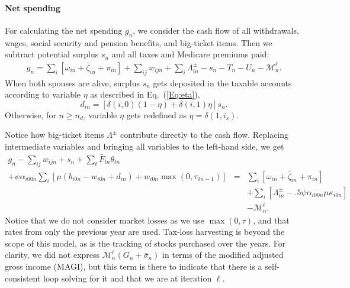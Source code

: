 \documentclass{report}[fleqn,12pt]
\begin{document}
\paragraph*{Net spending}
	For calculating the net spending $g_n$, we consider the cash flow of all withdrawals,
	wages, social security and pension benefits, and big-ticket items. 
	Then we subtract potential surplus $s_{n}$ and all taxes and Medicare premiums paid:
	\begin{eqnarray}
		g_n = \sum_i [\omega_{in} + \bar{\zeta}_{in} + \pi_{in} ] 
		+ \sum_{ij} w_{ijn} + \sum_i \Lambda^\pm_{in} - s_{n}
		- T_n - U_n - \mathcal{M}^\ell_n.
	\end{eqnarray}
	When both spouses are alive, surplus $s_n$ gets deposited in the taxable accounts
	according to variable $\eta$ as described in Eq.~(\ref{Eq:eta}),
	\begin{equation}
		\label{Eq:eta2}
		d_{in} = [\delta(i, 0)(1 - \eta) + \delta(i, 1)\eta] s_n .
	\end{equation}
	Otherwise, for $n \ge n_d$, variable $\eta$ gets redefined as $\eta = \delta(1, i_s)$.

	Notice how big-ticket items $\Lambda^\pm$ contribute directly to the cash flow.
	Replacing intermediate variables and bringing all variables to the left-hand side, we get
	\begin{eqnarray}
		\label{Eq:C4}
		g_n - \sum_{ij} w_{ijn} + s_{n}
		+ \sum_t \bar{F}_{tn} \theta_{t n} &&\nonumber \\
		+ \psi\alpha_{i00n} \sum_{i} \left[\mu(b_{i0n} - w_{i0n} + d_{in})
		+ w_{i0n}\max(0, \tau_{0n-1})\right] 
		&=& \sum_i [\omega_{in} + \bar{\zeta}_{in} + \pi_{in} ] \nonumber\\
		&& + \sum_i [\Lambda^\pm_{in} - .5\psi\alpha_{i00n}\mu\kappa_{i0n}] \nonumber\\
		&& - \mathcal{M}_n^\ell.
	\end{eqnarray}
	Notice that we do not consider market losses as we use $\max(0, \tau)$, and that
	rates from only the previous year are used. Tax-loss
	harvesting is beyond the scope of this model, as is the tracking of stocks
	purchased over the years.
	For clarity, we did not express $\mathcal{M}_n^\ell(G_n+\bar{\sigma}_n)$ in terms of the modified
	adjusted gross income (MAGI), but this term is there to indicate that there is a self-consistent
	loop solving for it and that we are at iteration $\ell$.
\end{document}
